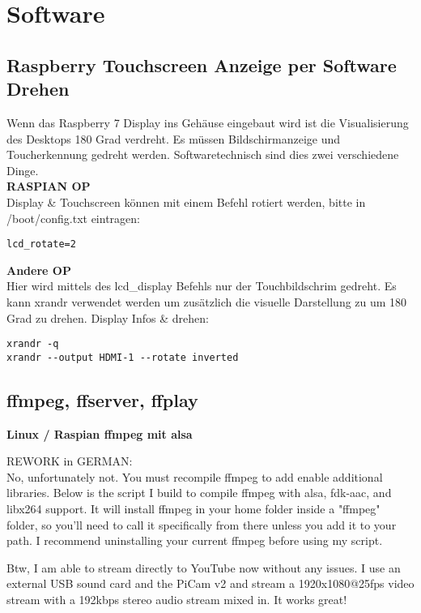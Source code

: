 \newpage
\section{Software}

\subsection{Raspberry Touchscreen Anzeige per Software Drehen}
Wenn das Raspberry 7\grqq{} Display ins Gehäuse eingebaut wird ist die 
Visualisierung des Desktops 180 Grad verdreht. Es müssen Bildschirmanzeige 
und Toucherkennung gedreht werden. Softwaretechnisch sind dies zwei verschiedene 
Dinge.\\

\textbf{RASPIAN OP}\\
Display \& Touchscreen können mit einem Befehl rotiert werden, 
bitte in /boot/config.txt eintragen:
\begin{verbatim}lcd_rotate=2\end{verbatim}

\textbf{Andere OP}\\
Hier wird mittels des lcd\_display Befehls nur der Touchbildschrim 
gedreht. Es kann xrandr verwendet werden um zusätzlich die visuelle Darstellung zu 
um 180 Grad zu drehen. Display Infos \& drehen:
\begin{verbatim}
xrandr -q
xrandr --output HDMI-1 --rotate inverted
\end{verbatim}


\subsection{ffmpeg, ffserver, ffplay}

\textbf{Linux / Raspian ffmpeg mit alsa} %
   
REWORK in GERMAN:\\
No, unfortunately not. You must recompile ffmpeg to add enable additional libraries. Below is the script I build to compile ffmpeg with alsa, fdk-aac, and libx264 support. It will install ffmpeg in your home folder inside a "ffmpeg" folder, so you'll need to call it specifically from there unless you add it to your path. I recommend uninstalling your current ffmpeg before using my script.

Btw, I am able to stream directly to YouTube now without any issues. I use an external USB sound card and the PiCam v2 and stream a 1920x1080@25fps video stream with a 192kbps stereo audio stream mixed in. It works great!\\

